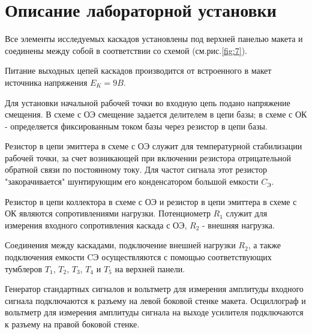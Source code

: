 \section{Описание лабораторной установки}
Все элементы исследуемых каскадов установлены под верхней панелью макета и соединены между собой в соответствии со схемой (см.рис.\ref{fig:7}).

Питание выходных цепей каскадов производится от встроенного в макет источника напряжения $E_K=9B$.

Для установки начальной рабочей точки во входную цепь подано напряжение смещения. В схеме с ОЭ смещение задается делителем в цепи базы; в схеме с ОК - определяется фиксированным током базы через резистор в цепи базы.

Резистор в цепи эмиттера в схеме с ОЭ служит для температурной стабилизации рабочей точки, за счет возникающей при включении резистора отрицательной обратной связи по постоянному току. Для частот сигнала этот резистор "закорачивается" шунтирующим его конденсатором большой емкости $C_{\text{Э}}$.

Резистор в цепи коллектора в схеме с ОЭ и резистор в цепи эмиттера в схеме с ОК являются сопротивлениями нагрузки. Потенциометр $R_1$ служит для измерения входного сопротивления
каскада с ОЭ, $R_2$ - внешняя нагрузка.

Соединения между каскадами, подключение внешней нагрузки $R_2$, а также подключения емкости CЭ осуществляются с помощью соответствующих тумблеров $T_1$, $T_2$, $T_3$, $T_4$ и $T_5$ на верхней панели.

Генератор стандартных сигналов и вольтметр для измерения амплитуды входного сигнала подключаются к разъему на левой боковой стенке макета. Осциллограф и вольтметр для измерения амплитуды сигнала на выходе усилителя подключаются к разъему на правой боковой стенке.


